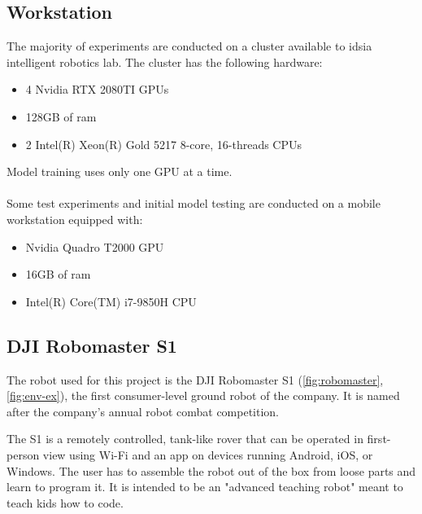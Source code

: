         \subsection{Workstation}
        The majority of experiments are conducted on a cluster available to \acrshort{idsia} intelligent robotics lab. The cluster has the following hardware:
        \begin{itemize}
            \item 4 Nvidia RTX 2080TI GPUs
            \item 128GB of ram
            \item 2 Intel(R) Xeon(R) Gold 5217 8-core, 16-threads CPUs
        \end{itemize}
        Model training uses only one GPU at a time.
        \\
        \\
        Some test experiments and initial model testing are conducted on a mobile workstation equipped with:
        \begin{itemize}
            \item Nvidia Quadro T2000 GPU
            \item 16GB of ram
            \item Intel(R) Core(TM) i7-9850H  CPU
        \end{itemize}

    
        \subsection{DJI Robomaster S1}
        \label{sub:robomaster}
        The robot used for this project is the DJI Robomaster S1 (\autoref{fig:robomaster}, \ref{fig:env-ex}), the first consumer-level ground robot of the company. It is named after the company's annual robot combat competition.
        
        The S1 is a remotely controlled, tank-like rover that can be operated in first-person view using Wi-Fi and an app on devices running Android, iOS, or Windows. The user has to assemble the robot out of the box from loose parts and learn to program it. It is intended to be an "advanced teaching robot" meant to teach kids how to code.

